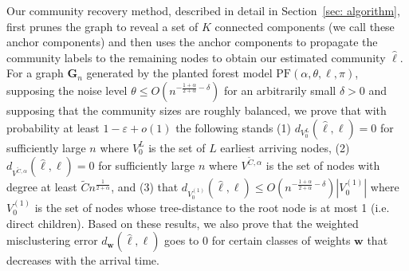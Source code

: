 \documentclass[twoside,11pt]{article}
\theoremstyle{remark}
\begin{document}
Our community recovery method, described in detail in Section~\ref{sec: algorithm}, first prunes the graph to reveal a set of $K$ connected components (we call these anchor components) and then uses the anchor components to propagate the community labels to the remaining nodes to obtain our estimated community $\hat{\ell}$. For a graph $\bm{G}_n$ generated by the planted forest model $\mathrm{PF}(\alpha, \theta, \ell, \pi)$, supposing the noise level $\theta \leq O( n^{-\frac{1+\alpha}{2+\alpha} - \delta })$ for an arbitrarily small $\delta > 0$ and supposing that the community sizes are roughly balanced, 
we prove that with probability at least $1-\varepsilon+o(1)$ the following stands
(1) $d_{V_0^L}(\hat{\ell}, \ell) = 0$ for sufficiently large $n$ where $V_0^L$ is the set of $L$ earliest arriving nodes, (2) $d_{V^{\tilde{C}, \alpha}}(\hat{\ell}, \ell) = 0$ for sufficiently large $n$ where $V^{\tilde{C}, \alpha}$ is the set of nodes with degree at least $\tilde{C}n^{\frac{1}{2+\alpha}}$, and (3) that $d_{V_0^{(1)}}(\hat{\ell}, \ell) \leq O( n^{- \frac{1+\alpha}{2+\alpha} - \delta} )|V_0^{(1)}|$ where $V_0^{(1)}$ is the set of nodes whose tree-distance to the root node is at most 1 (i.e. direct children).
Based on these results, we also prove that the weighted misclustering error $d_{\bm{w}}(\hat{\ell}, \ell)$ goes to 0 for certain classes of weights $\bm{w}$ that decreases with the arrival time. 



\end{document}
